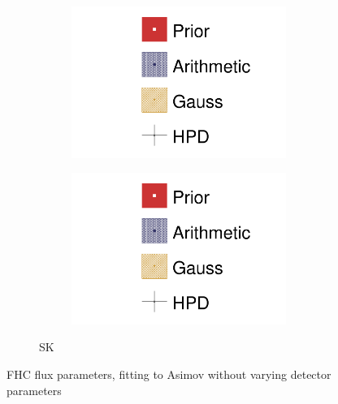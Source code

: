 \begin{figure}[h]
\begin{subfigure}[t]{\textwidth}
\begin{subfigure}[t]{0.24\textwidth}
	\includegraphics[width=\textwidth,page=12, trim={0mm 0mm 0mm 9mm}, clip]{figures/mach3/2018/asimov/2018a_MultiPi_Binningv6_NewCov_Asimov_NoDet_merge_drawPar}
\end{subfigure}
\begin{subfigure}[t]{0.24\textwidth}
	\includegraphics[width=\textwidth,page=13, trim={0mm 0mm 0mm 9mm}, clip]{figures/mach3/2018/asimov/2018a_MultiPi_Binningv6_NewCov_Asimov_NoDet_merge_drawPar}
\end{subfigure}

\caption{SK}
\end{subfigure}
	\caption{FHC flux parameters, fitting to Asimov without varying detector parameters}
	\label{fig:asimov_fit_2018_nodet_fhc}
\end{figure}

